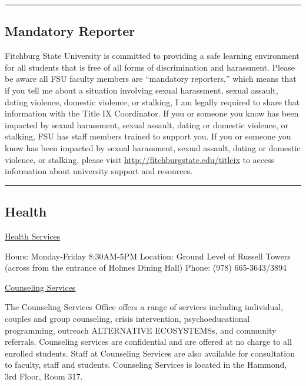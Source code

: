 \documentclass[
  letterpaper,
  DIV=11,
  numbers=noendperiod]{scrartcl}
\begin{document}
\begin{center}\rule{0.5\linewidth}{0.5pt}\end{center}

\hypertarget{mandatory-reporter}{%
\subsection{Mandatory Reporter}\label{mandatory-reporter}}

Fitchburg State University is committed to providing a safe learning
environment for all students that is free of all forms of discrimination
and harassment. Please be aware all FSU faculty members are ``mandatory
reporters,'' which means that if you tell me about a situation involving
sexual harassment, sexual assault, dating violence, domestic violence,
or stalking, I am legally required to share that information with the
Title IX Coordinator. If you or someone you know has been impacted by
sexual harassment, sexual assault, dating or domestic violence, or
stalking, FSU has staff members trained to support you. If you or
someone you know has been impacted by sexual harassment, sexual assault,
dating or domestic violence, or stalking, please visit
\url{http://fitchburgstate.edu/titleix} to access information about
university support and resources.

\begin{center}\rule{0.5\linewidth}{0.5pt}\end{center}

\hypertarget{health}{%
\subsection{Health}\label{health}}

\href{http://www.google.com/url?q=http\%3A\%2F\%2Fwww.fitchburgstate.edu\%2Foffices-services-directory\%2Fhealth-services\%2F\&sa=D\&sntz=1\&usg=AFQjCNEw5V0i0hL5DVO5b43gejNNaAt4ig}{Health
Services}

Hours: Monday-Friday 8:30AM-5PM Location: Ground Level of Russell Towers
(across from the entrance of Holmes Dining Hall) Phone: (978)
665-3643/3894

\href{http://www.google.com/url?q=http\%3A\%2F\%2Fwww.fitchburgstate.edu\%2Foffices-services-directory\%2Fcounseling-services\%2F\&sa=D\&sntz=1\&usg=AFQjCNEYiS4EmSvWerpp2bKr5lTpouPuqQ}{Counseling
Services}

The Counseling Services Office offers a range of services including
individual, couples and group counseling, crisis intervention,
psychoeducational programming, outreach ALTERNATIVE ECOSYSTEMSs, and
community referrals. Counseling services are confidential and are
offered at no charge to all enrolled students. Staff at Counseling
Services are also available for consultation to faculty, staff and
students. Counseling Services is located in the Hammond, 3rd Floor, Room
317.
\end{document}
